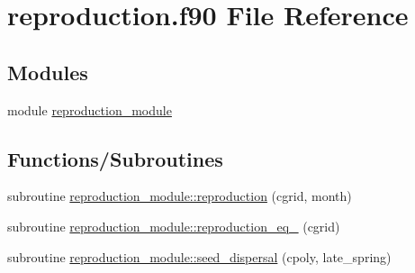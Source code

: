 \hypertarget{reproduction_8f90}{}\section{reproduction.\+f90 File Reference}
\label{reproduction_8f90}
\subsection*{Modules}
\begin{DoxyCompactItemize}
\item 
module \hyperlink{namespacereproduction__module}{reproduction\+\_\+module}
\end{DoxyCompactItemize}
\subsection*{Functions/\+Subroutines}
\begin{DoxyCompactItemize}
\item 
subroutine \hyperlink{namespacereproduction__module_ac201580dce4b65ddfe09b9e9cf32b91b}{reproduction\+\_\+module\+::reproduction} (cgrid, month)
\item 
subroutine \hyperlink{namespacereproduction__module_a6f519f25524698c2d30d646abbac9727}{reproduction\+\_\+module\+::reproduction\+\_\+eq\+\_} (cgrid)
\item 
subroutine \hyperlink{namespacereproduction__module_aaf75bf8a30e84631fd53bb0d11fcf296}{reproduction\+\_\+module\+::seed\+\_\+dispersal} (cpoly, late\+\_\+spring)
\end{DoxyCompactItemize}
